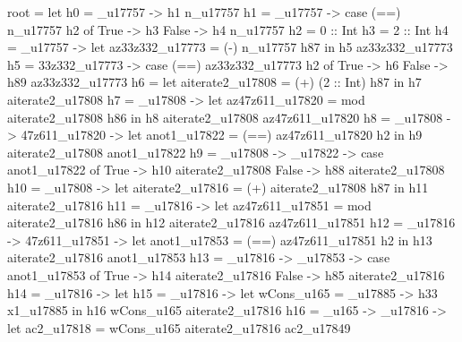 root = let
         h0 = \n_u17757 -> h1 n_u17757
         h1 = \n_u17757 -> case (==) n_u17757 h2 of
                             True -> h3
                             False -> h4 n_u17757
         h2 = 0 :: Int
         h3 = 2 :: Int
         h4 = \n_u17757 -> let az33z332_u17773 = (-) n_u17757 h87
                           in h5 az33z332_u17773
         h5 = \az33z332_u17773 -> case (==) az33z332_u17773 h2 of
                                    True -> h6
                                    False -> h89 az33z332_u17773
         h6 = let aiterate2_u17808 = (+) (2 :: Int) h87
              in h7 aiterate2_u17808
         h7 = _u17808 -> let
                                     az47z611_u17820 = mod aiterate2_u17808 h86
                                   in h8 aiterate2_u17808 az47z611_u17820
         h8 = _u17808 -> \az47z611_u17820 -> let
                                                         anot1_u17822 = (==) az47z611_u17820 h2
                                                       in h9 aiterate2_u17808 anot1_u17822
         h9 = _u17808 -> _u17822 -> case anot1_u17822 of
                                                      True -> h10 aiterate2_u17808
                                                      False -> h88 aiterate2_u17808
         h10 = _u17808 -> let
                                      aiterate2_u17816 = (+) aiterate2_u17808 h87
                                    in h11 aiterate2_u17816
         h11 = _u17816 -> let
                                      az47z611_u17851 = mod aiterate2_u17816 h86
                                    in h12 aiterate2_u17816 az47z611_u17851
         h12 = _u17816 -> \az47z611_u17851 -> let
                                                          anot1_u17853 = (==) az47z611_u17851 h2
                                                        in h13 aiterate2_u17816 anot1_u17853
         h13 = _u17816 -> _u17853 -> case anot1_u17853 of
                                                       True -> h14 aiterate2_u17816
                                                       False -> h85 aiterate2_u17816
         h14 = _u17816 -> let
                                      h15 = _u17816 -> let
                                                                   wCons_u165 = _u17885 -> h33 x1_u17885
                                                                 in h16 wCons_u165 aiterate2_u17816
                                      h16 = \wCons_u165 -> _u17816 -> let
                                                                                  ac2_u17818 = wCons_u165 aiterate2_u17816 ac2_u17849
